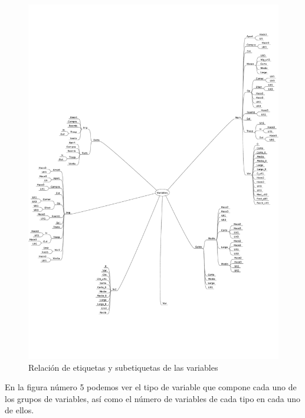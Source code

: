 \documentclass[11pt,a4paper,spanish]{article} %
\begin{document}
\begin{figure}[h!]
	\begin{center}
	\includegraphics[width=\textwidth]{Z_01_04_Variables.pdf}
    \caption{Relación de etiquetas y subetiquetas de las variables}
    \end{center}
\end{figure}

\newpage


En la figura número 5 podemos ver el tipo de variable que compone cada uno de los grupos de variables, así como el número de variables de cada tipo en cada uno de ellos.  
\end{document}
